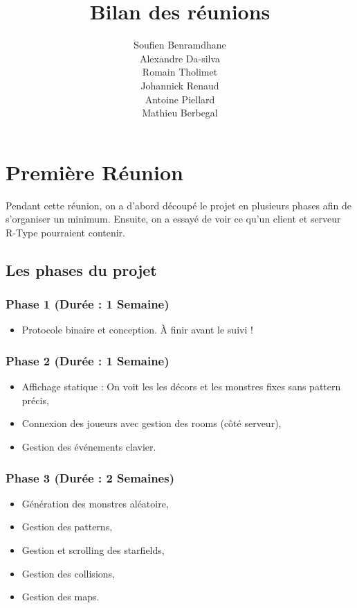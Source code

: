\documentclass{article}
\begin{document}
\title{Bilan des réunions}
\author{
    Soufien Benramdhane\\
    Alexandre Da-silva\\
    Romain Tholimet\\
    Johannick Renaud\\
    Antoine Piellard\\
    Mathieu Berbegal
}
\maketitle
\newpage
\section{Première Réunion}
Pendant cette réunion, on a d'abord découpé le projet en plusieurs phases afin
de s'organiser un minimum. Ensuite, on a essayé de voir ce qu'un client et
serveur R-Type pourraient contenir.
\subsection{Les phases du projet}
\subsubsection{Phase 1 (Durée : 1 Semaine)}
\begin{itemize}
  \item{Protocole binaire et conception. À finir avant le suivi !}
\end{itemize}
\subsubsection{Phase 2 (Durée : 1 Semaine)}
\begin{itemize}
  \item{Affichage statique : On voit les les décors et les monstres fixes sans
  pattern précis,}
  \item{Connexion des joueurs avec gestion des rooms (côté serveur),}
  \item{Gestion des événements clavier.}
\end{itemize}
\subsubsection{Phase 3 (Durée : 2 Semaines)}
\begin{itemize}
  \item{Génération des monstres aléatoire,}
  \item{Gestion des patterns,}
  \item{Gestion et scrolling des starfields,}
  \item{Gestion des collisions,}
  \item{Gestion des maps.}
\end{itemize}
\end{document}
